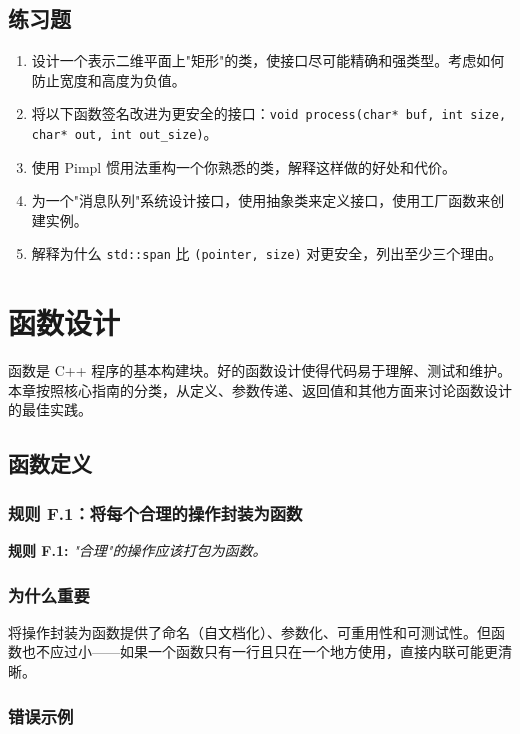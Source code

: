 \section*{练习题}

\begin{enumerate}
  \item 设计一个表示二维平面上"矩形"的类，使接口尽可能精确和强类型。考虑如何防止宽度和高度为负值。
  \item 将以下函数签名改进为更安全的接口：\texttt{void process(char* buf, int size, char* out, int out\_size)}。
  \item 使用 Pimpl 惯用法重构一个你熟悉的类，解释这样做的好处和代价。
  \item 为一个"消息队列"系统设计接口，使用抽象类来定义接口，使用工厂函数来创建实例。
  \item 解释为什么 \texttt{std::span} 比 \texttt{(pointer, size)} 对更安全，列出至少三个理由。
\end{enumerate}


\chapter{函数设计}

函数是 C++ 程序的基本构建块。好的函数设计使得代码易于理解、测试和维护。本章按照核心指南的分类，从定义、参数传递、返回值和其他方面来讨论函数设计的最佳实践。

\section{函数定义}

\subsection{规则 F.1：将每个合理的操作封装为函数}

\textbf{规则 F.1:} \textit{"合理"的操作应该打包为函数。}

\subsection{为什么重要}

将操作封装为函数提供了命名（自文档化）、参数化、可重用性和可测试性。但函数也不应过小——如果一个函数只有一行且只在一个地方使用，直接内联可能更清晰。

\subsection{错误示例}

